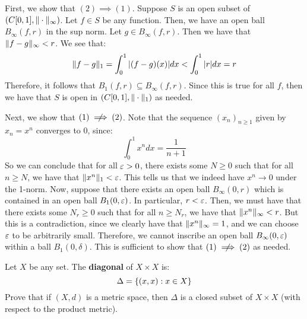 \documentclass{article}
\begin{document}
\begin{soln}
    First, we show that $ (2) \implies (1) $.
    Suppose $ S $ is an open subset of $ (C[0, 1], \|\cdot\|_{\infty}) $.
    Let $ f \in S $ be any function.
    Then, we have an open ball $ B_{\infty}(f, r) $ in the sup norm.
    Let $ g \in B_{\infty}(f, r) $. Then we have that $ \|f - g\|_{\infty} < r $.
    We see that:
    \begin{equation*}
        \|f - g\|_{1} = \int_{0}^{1} \abs{(f - g)(x)} dx < \int_{0}^{1} \abs{r} dx = r
    \end{equation*}
    Therefore, it follows that $ B_{1}(f, r) \subseteq B_{\infty}(f, r) $.
    Since this is true for all $ f $,
    then we have that $ S $ is open in $ (C[0, 1], \|\cdot\|_{1}) $ as needed. \npgh

    Next, we show that $ (1) \cnot\implies (2) $. Note that the sequence $ (x_{n})_{n \geq 1} $
    given by $ x_{n} = x^{n} $ converges to $ 0 $, since:
    \begin{equation*}
        \int_{0}^{1} x^{n} dx = \frac{1}{n + 1}
    \end{equation*}
    So we can conclude that for all $ \operatorname{\varepsilon} > 0 $, there exists some $ N \geq 0 $ such that
    for all $ n \geq N $, we have that $ \|x^{n}\|_{1} < \operatorname{\varepsilon} $.
    This tells us that we indeed have $ x^{n} \rightarrow 0 $ under the 1-norm. \vsp
    Now, suppose that there exists an open ball $ B_{\infty}(0, r) $ which is contained in
    an open ball $ B_{1}(0, \operatorname{\varepsilon}) $. In particular, $ r < \operatorname{\varepsilon} $. \vsp
    Then, we must have that there exists some $ N_{r} \geq 0 $ such that for all $ n \geq N_{r} $,
    we have that $ \|x^{n}\|_{\infty} < r $. But this is a contradiction, since we clearly
    have that $ \|x^{n}\|_{\infty} = 1 $, and we can choose $ \operatorname{\varepsilon} $ to be arbitrarily small.
    Therefore, we cannot inscribe an open ball $ B_{\infty}(0, \operatorname{\varepsilon}) $ within
    a ball $ B_{1}(0, \delta) $. This is sufficient to show that $ (1) \cnot \implies (2) $
    as needed.
\end{soln}

\newpage
{}

\begin{qu}
    Let $ X $ be any set.
    The \textbf{diagonal} of $ X \times X $ is:
    \begin{equation*}
        \Delta = \left\{{(x, x) : x \in X}\right\}
    \end{equation*}
    Prove that if $ (X, d) $ is a metric space, then $ \Delta $ is a closed subset of
    $ X \times X $ (with respect to the product metric).
\end{qu}
\end{document}
